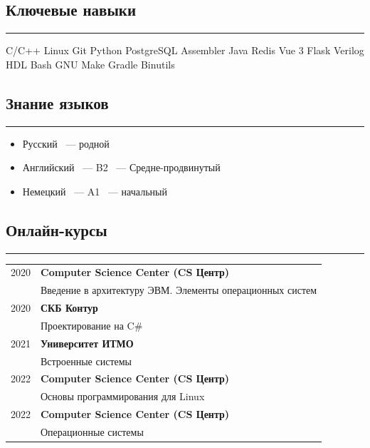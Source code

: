 \documentclass[10pt, final, twoside]{article}
\newcommand{\skill}[1]{\colorbox{darkgray4}{\textcolor{darkgray2}{#1}}}
\begin{document}
  \subsection*{\textcolor{darkgray2}{Ключевые навыки}}
  \vspace*{-5.5mm}
  \par\noindent\rule{\textwidth}{0.1pt}
    \skill{C/C++} \skill{Linux} \skill{Git} \skill{Python} \skill{PostgreSQL} \skill{Assembler} \skill{Java} \skill{Redis} \skill{Vue 3} \skill{Flask} \skill{Verilog HDL} \skill{Bash} \skill{GNU Make} \skill{Gradle} \skill{Binutils}

  \subsection*{\textcolor{darkgray2}{Знание языков}}
  \vspace*{-5.5mm}
  \par\noindent\rule{\textwidth}{0.1pt}
  \begin{itemize}
    \item Русский ~--- родной
    \item Английский ~--- B2 ~--- Средне-продвинутый
    \item Немецкий ~--- A1 ~--- начальный
  \end{itemize}

  \subsection*{\textcolor{darkgray2}{Онлайн-курсы}}
  \vspace*{-5.5mm}
  \par\noindent\rule{\textwidth}{0.1pt}
  \begin{table}[H]
    \begin{tabular}{ll}
      2020 & \textbf{Computer Science Center (CS Центр)}\\
           & Введение в архитектуру ЭВМ. Элементы операционных систем\\\hline
      2020 & \textbf{СКБ Контур}\\
           & Проектирование на C\#\\\hline
      2021 & \textbf{Университет ИТМО}\\
           & Встроенные системы\\\hline
      2022 & \textbf{Computer Science Center (CS Центр)}\\
           & Основы программирования для Linux\\\hline
      2022 & \textbf{Computer Science Center (CS Центр)}\\
           & Операционные системы\\\hline
    \end{tabular}
  \end{table}
\end{document}
